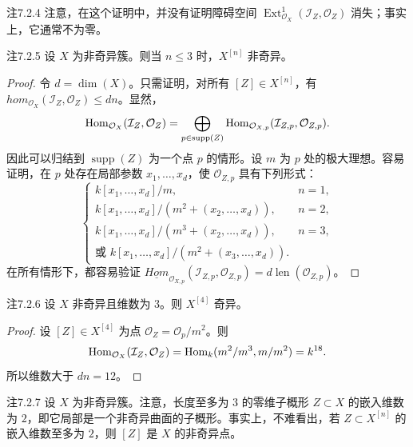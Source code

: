 \begin{origstatement}{注}{7.2.4}\label{ch07:7.2.4}
注意，在这个证明中，并没有证明障碍空间 $\operatorname{Ext}^1_{\mathcal O_X}(\mathcal I_Z,\mathcal O_Z)$ 消失；事实上，它通常不为零。
\end{origstatement}
\begin{origstatement}{注}{7.2.5}\label{ch07:7.2.5}
设 $X$ 为非奇异簇。则当 $n\leq3$ 时，$X^{[n]}$ 非奇异。
\end{origstatement}
\begin{proof}
令 $d=\dim(X)$。只需证明，对所有 $[Z]\in X^{[n]}$，有 $hom_{\mathcal O_X}(\mathcal I_Z,\mathcal O_Z)\leq dn$。显然，
\[
\operatorname{Hom}_{\mathcal O_X}(\mathcal I_Z,\mathcal O_Z)
=\bigoplus_{p\in\operatorname{supp}(Z)}
\operatorname{Hom}_{\mathcal O_{X,p}}(\mathcal I_{Z,p},\mathcal O_{Z,p}).
\]
因此可以归结到 $\operatorname{supp}(Z)$ 为一个点 $p$ 的情形。设 $m$ 为 $p$ 处的极大理想。容易证明，在 $p$ 处存在局部参数 $x_1,\ldots,x_d$，使 $\mathcal O_{Z,p}$ 具有下列形式：
\[
\begin{cases}
k[x_1,\ldots,x_d]/m,&n=1,\\
k[x_1,\ldots,x_d]/(m^2+(x_2,\ldots,x_d)),&n=2,\\
k[x_1,\ldots,x_d]/(m^3+(x_2,\ldots,x_d)),&n=3,\\
\text{或 }k[x_1,\ldots,x_d]/(m^2+(x_3,\ldots,x_d)).&
\end{cases}
\]
在所有情形下，都容易验证 $\underline{Hom}_{\mathcal O_{X,p}}(\mathcal I_{Z,p},\mathcal O_{Z,p})=d\operatorname{len}(\mathcal O_{Z,p})$。
\end{proof}
\begin{origstatement}{注}{7.2.6}\label{ch07:7.2.6}
设 $X$ 非奇异且维数为 $3$。则 $X^{[4]}$ 奇异。
\end{origstatement}
\begin{proof}
设 $[Z]\in X^{[4]}$ 为点 $\mathcal O_Z=\mathcal O_p/m^2$。则
\[
\operatorname{Hom}_{\mathcal O_X}(\mathcal I_Z,\mathcal O_Z)
=\operatorname{Hom}_k(m^2/m^3,m/m^2)=k^{18}.
\]
所以维数大于 $dn=12$。
\end{proof}
\begin{origstatement}{注}{7.2.7}\label{ch07:7.2.7}
设 $X$ 为非奇异簇。注意，长度至多为 $3$ 的零维子概形 $Z\subset X$ 的嵌入维数为 $2$，即它局部是一个非奇异曲面的子概形。事实上，不难看出，若 $Z\subset X^{[n]}$ 的嵌入维数至多为 $2$，则 $[Z]$ 是 $X$ 的非奇异点。
\end{origstatement}
